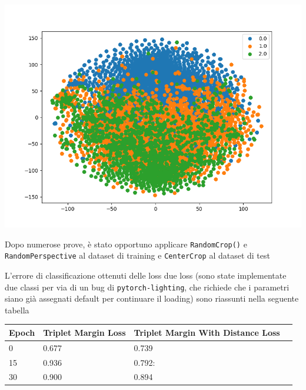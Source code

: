 \documentclass[11pt]{article}
\begin{document}
\begin{center}
\begin{minipage}{0.3\linewidth}
    \includegraphics[width=\linewidth]{09.png}
    \end{minipage}
\end{center}

Dopo numerose prove, è stato opportuno applicare \texttt{RandomCrop()} e \texttt{RandomPerspective} al dataset di training e \texttt{CenterCrop} al dataset di test

L'errore di classificazione ottenuti delle loss due loss (sono state implementate due classi per via di un bug di \texttt{pytorch-lighting},
che richiede che i parametri siano già assegnati default per continuare il loading) sono riassunti nella seguente tabella

\begin{center}
    \begin{tabular}{ | l | l | l | p{5cm} |}
    \hline
    Epoch & Triplet Margin Loss & Triplet Margin With Distance Loss \\ \hline
    0 & 0.677 & 0.739 \\ \hline
    15 & 0.936 & 0.792: \\ \hline
    30 & 0.900 & 0.894  \\
    \hline
    \end{tabular}
\end{center}
\end{document}

